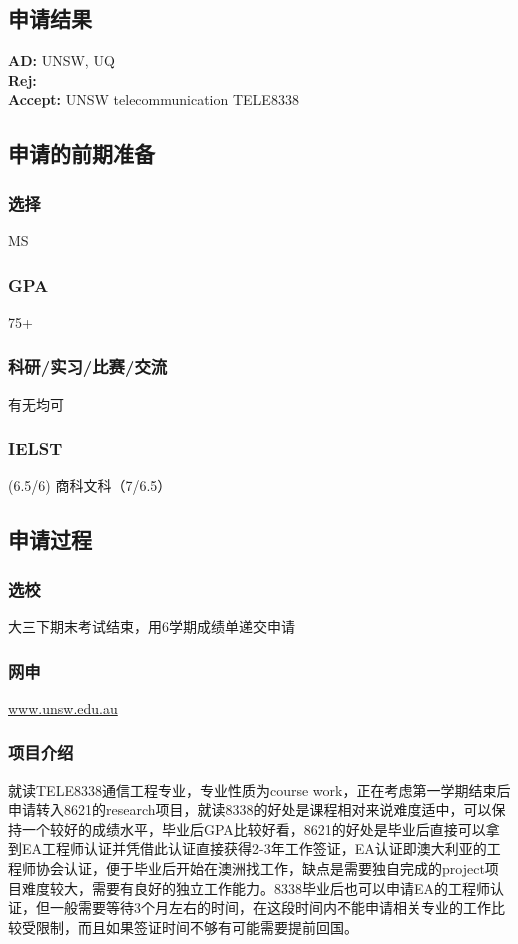 \documentclass[a4paper,UTF8]{book}
\begin{document}
    \subsection*{申请结果}
        \textbf{AD:} UNSW, UQ\\
        \textbf{Rej:} \\
        \textbf{Accept:} UNSW telecommunication TELE8338

    \subsection*{申请的前期准备}
        \subsubsection*{选择}
        MS

        \subsubsection*{GPA}
        75+

        \subsubsection*{科研/实习/比赛/交流}
        有无均可

        \subsubsection*{IELST}
        (6.5/6) 商科文科（7/6.5）

    \subsection*{申请过程}
        \subsubsection*{选校}
        大三下期末考试结束，用6学期成绩单递交申请

        \subsubsection*{网申}
        \url{www.unsw.edu.au}

        \subsubsection*{项目介绍}
        就读TELE8338通信工程专业，专业性质为course work，正在考虑第一学期结束后申请转入8621的research项目，就读8338的好处是课程相对来说难度适中，可以保持一个较好的成绩水平，毕业后GPA比较好看，8621的好处是毕业后直接可以拿到EA工程师认证并凭借此认证直接获得2-3年工作签证，EA认证即澳大利亚的工程师协会认证，便于毕业后开始在澳洲找工作，缺点是需要独自完成的project项目难度较大，需要有良好的独立工作能力。8338毕业后也可以申请EA的工程师认证，但一般需要等待3个月左右的时间，在这段时间内不能申请相关专业的工作比较受限制，而且如果签证时间不够有可能需要提前回国。
\end{document}
